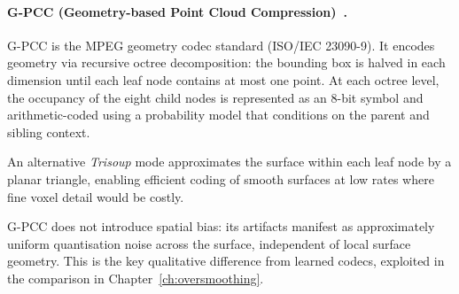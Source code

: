 \paragraph{G-PCC (Geometry-based Point Cloud Compression)~\cite{graziosi2020gpcc}.}
G-PCC is the MPEG geometry codec standard (ISO/IEC 23090-9).
It encodes geometry via recursive octree decomposition: the bounding box
is halved in each dimension until each leaf node contains at most one point.
At each octree level, the occupancy of the eight child nodes is represented
as an 8-bit symbol and arithmetic-coded using a probability model that
conditions on the parent and sibling context.

An alternative \emph{Trisoup} mode approximates the surface within each
leaf node by a planar triangle, enabling efficient coding of smooth surfaces
at low rates where fine voxel detail would be costly.

G-PCC does not introduce spatial bias: its artifacts manifest as
approximately uniform quantisation noise across the surface, independent
of local surface geometry.
This is the key qualitative difference from learned codecs, exploited in
the comparison in Chapter~\ref{ch:oversmoothing}.

